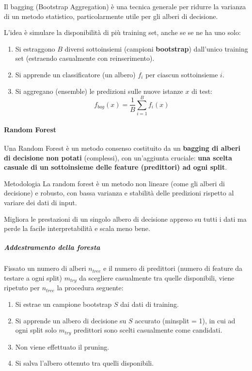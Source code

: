 Il bagging (Bootstrap Aggregation) è una tecnica generale per ridurre la
varianza di un metodo statistico, particolarmente utile per gli alberi
di decisione.

L'idea è simulare la disponibilità di più training set, anche se se ne ha
uno solo:
\begin{enumerate}
    \item Si estraggono $B$ diversi sottoinsiemi (campioni \textbf{bootstrap})
    dall'unico training set (estraendo casualmente con reinserimento).
    \item Si apprende un classificatore (un albero) $f_i$ per ciascun
    sottoinsieme $i$.
    \item Si aggregano (ensemble) le predizioni sulle nuove istanze $x$ di test:
    \[
    f_{bag}(x) = \frac{1}{B} \sum_{i=1}^{B} f_i(x)
    \]
\end{enumerate}


\paragraph{Random Forest}
Una Random Forest è un metodo consenso costituito da un
\textbf{bagging di alberi di decisione non potati} (complessi), con
un'aggiunta cruciale: \textbf{una scelta casuale di un sottoinsieme delle
feature (predittori) ad ogni split}.

\begin{nota}{Metodologia}{}
    La random forest è un metodo non lineare (come gli alberi di decisione)
    e robusto, con bassa varianza e stabilità delle predizioni rispetto al
    variare dei dati di input.
    
    Migliora le prestazioni di un singolo albero di decisione appreso su
    tutti i dati ma perde la facile interpretabilità e scala meno bene.
\end{nota}

\subparagraph{Addestramento della foresta}
Fissato un numero di alberi $n_{tree}$ e il numero di predittori (numero di
feature da testare a ogni split) $m_{try}$ da scegliere casualmente tra quelle
disponibili, viene ripetuto per $n_{tree}$ la procedura seguente:
\begin{enumerate}
    \item Si estrae un campione bootstrap $S$ dai dati di training.
    \item Si apprende un albero di decisione su $S$ accurato (minsplit = 1),
    in cui ad ogni split solo $m_{try}$ predittori sono scelti casualmente
    come candidati.
    \item Non viene effettuato il pruning.
    \item Si salva l'albero ottenuto tra quelli disponibili.
\end{enumerate}


